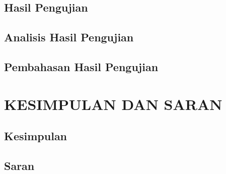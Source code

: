 \documentclass[ugmtesis]{ugmtesis}
\begin{document}
	\section{Hasil Pengujian}
	\label{hasil pengujian}
	

	\section{Analisis Hasil Pengujian}
	\label{analisis hasil pengujian}
	

	\section{Pembahasan Hasil Pengujian}
	\label{pembahasan hasil pengujian}
	




\chapter{KESIMPULAN DAN SARAN}
\label{kesimpulan dan saran}

	\section{Kesimpulan}
	\label{penutup kesimpulan}
	

	\section{Saran}
	\label{penutup saran}
	



\end{document}

